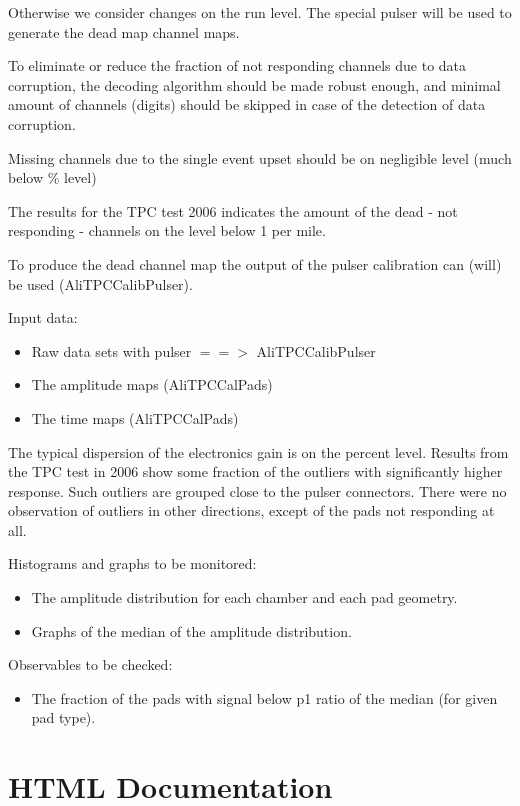 \documentclass[a4paper,12pt]{article}
\begin{document}
Otherwise we consider changes on the run level. The special pulser will be
used to generate the dead map channel maps.  

To eliminate or reduce the fraction of not responding channels due to data
corruption, the decoding algorithm should be made robust enough, and minimal 
amount of channels (digits) should be skipped in case of the detection of data 
corruption.  

Missing channels due to the single event upset should be on negligible level 
(much below  \% level)

The results for the TPC test 2006 indicates the amount of the dead - not 
responding - channels on the level below 1 per mile.  

To produce the dead channel map the output of the pulser calibration can (will)
be used (AliTPCCalibPulser). 

Input data:
\begin{itemize}
 \item Raw data sets with pulser $==>$ AliTPCCalibPulser
 \item The amplitude maps (AliTPCCalPads)
 \item The time maps (AliTPCCalPads) 
\end{itemize}

The typical dispersion of the electronics gain is on the percent level. Results
from the TPC test in 2006 show some fraction of the outliers with significantly
higher response. Such outliers are grouped close to the pulser connectors.  
There were no observation of outliers in other directions, except of the pads 
not responding at all.

Histograms and graphs to be monitored:
\begin{itemize}
 \item The amplitude distribution for each chamber and each pad geometry.
 \item Graphs of the median of the amplitude distribution.
\end{itemize}

Observables to be checked:
\begin{itemize}
 \item The fraction of the pads with signal below p1 ratio of the median 
      (for given pad type). 
\end{itemize} 



\section{HTML Documentation}
\end{document}
